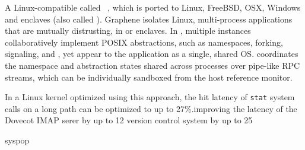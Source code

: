 \begin{compactitem}

\item A Linux-compatible \libos{} called \term{\graphene{}}~\citep{tsai14graphene},
which is ported to Linux, FreeBSD, OSX,
Windows and \intel{} \sgx{} enclaves (also called \term{\graphenesgx{}}).
Graphene isolates Linux, multi-process applications that are mutually distrusting,
in \picoprocs{} or enclaves.
In \graphene{}, multiple \libos{} instances
collaboratively implement
POSIX abstractions,
such as namespaces, forking, signaling, and \sysvipc{},
yet appear to the application
as a single, shared OS.
\graphene{} coordinates the namespace and abstraction states shared across processes
over pipe-like RPC streams,
which can be individually sandboxed from the host reference monitor.


\item 
In a Linux kernel optimized using this approach,
the hit latency of {\tt stat} system calls on a long path
can be optimized to up to 27\%.improving the
latency of the Dovecot IMAP serer by up to 12%
version control system by up to 25%


\item syspop



\end{compactitem}
